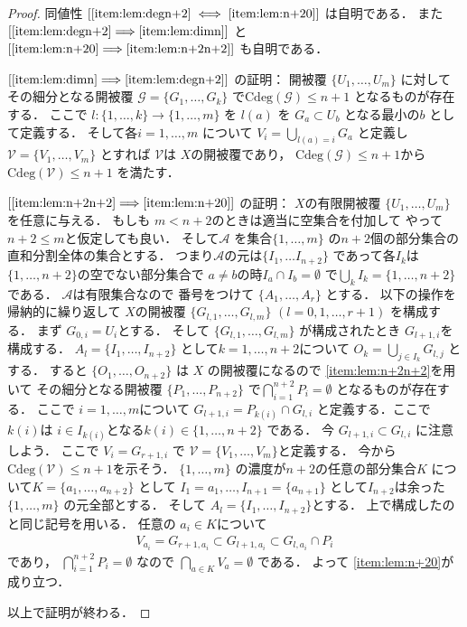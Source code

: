 \documentclass[leqno, a4paper, 12pt]{jsarticle}
\newcommand{\To}{\Longrightarrow}
\newcommand{\yodeg}{\mathrm{Cdeg}}
\numberwithin{equation}{section}
\begin{document}
\begin{proof}
同値性
$[\ref{item:lem:degn+2} \iff \ref{item:lem:n+20}]$
は自明である．
また
$[\ref{item:lem:degn+2}\To \ref{item:lem:dimn}]$
と
$[ \ref{item:lem:n+20}\To \ref{item:lem:n+2n+2}]$
も自明である．


$[\ref{item:lem:dimn}\To \ref{item:lem:degn+2}]$
の証明：
開被覆
$\{U_{1}, \dots, U_{m}\}$
に対してその細分となる開被覆
$\mathcal{G}=\{G_{1}, \dots, G_{k}\}$
で$\yodeg(\mathcal{G})\le n+1$
となるものが存在する．
ここで
$l\colon \{1, \dots, k\}\to \{1, \dots, m\}$
を
$l(a)$
を
$G_{a}\subset U_{b}$
となる最小の$b$
として定義する．
そして各$i=1, \dots,  m$
について
$V_{i}=\bigcup_{l(a)=i}G_{a}$
と定義し
$\mathcal{V}=\{V_{1}, \dots, V_{m}\}$
とすれば
$\mathcal{V}$は
$X$の開被覆であり，
$\yodeg(\mathcal{G})\le n+1$から
$\yodeg(\mathcal{V})\le n+1$
を満たす．

$[\ref{item:lem:n+2n+2}\To \ref{item:lem:n+20}]$
の証明：
$X$の有限開被覆
$\{U_{1}, \dots, U_{m}\}$
を任意に与える．
もしも
$m<n+2$のときは適当に空集合を付加して
やって$n+2\le m$と仮定しても良い．
そして$\mathcal{A}$
を集合$\{1, \dots, m\}$
の$n+2$個の部分集合の直和分割全体の集合とする．
つまり$\mathcal{A}$の元は$\{I_{1}, \dots I_{n+2}\}$
であって各$I_{k}$は$\{1, \dots, n+2\}$の空でない部分集合で
$a\neq b$の時$I_{a}\cap I_{b}=\emptyset$
で$\bigcup_{k}I_{k}=\{1, \dots, n+2\}$
である．
$\mathcal{A}$は有限集合なので
番号をつけて
$\{A_{1}, \dots, A_{r}\}$
とする．
以下の操作を帰納的に繰り返して
$X$の開被覆
$\{G_{l, 1}, \dots, G_{l, m}\}$
$(l=0, 1, \dots, r+1)$
を構成する．
まず
$G_{0, i}=U_{i}$とする．
そして
$\{G_{l, 1}, \dots, G_{l, m}\}$
が構成されたとき
$G_{l+1, i}$を構成する．
$A_{l}=\{I_{1}, \dots, I_{n+2}\}$
として$k=1, \dots, n+2$について
$O_{k}=\bigcup_{j\in I_{k}}G_{l, j}$
とする．
すると
$\{O_{1}, \dots, O_{n+2}\}$
は
$X$
の開被覆になるので
\ref{item:lem:n+2n+2}を用いて
その細分となる開被覆
$\{P_{1}, \dots, P_{n+2}\}$
で$\bigcap_{i=1}^{n+2}P_{i}=\emptyset$
となるものが存在する．
ここで
$i=1, \dots, m$について
$G_{l+1, i}=P_{k(i)}\cap G_{l, i}$
と定義する．ここで$k(i)$は
$i\in I_{k(i)}$となる$k(i)\in \{1, \dots, n+2\}$
である．
今
$G_{l+1, i}\subset G_{l, i}$
に注意しよう．
ここで
$V_{i}=G_{r+1, i}$
で
$\mathcal{V}=\{V_{1}, \dots, V_{m}\}$と定義する．
今から$\yodeg(\mathcal{V})\le n+1$を示そう．
$\{1, \dots, m\}$
の濃度が$n+2$の任意の部分集合$K$
について$K=\{a_{1}, \dots, a_{n+2}\}$
として
$I_{1}=a_{1}, \dots, I_{n+1}=\{a_{n+1}\}$
として$I_{n+2}$は余った$\{1, \dots, m\}$
の元全部とする．
そして
$A_{l}=\{I_{1}, \dots, I_{n+2}\}$とする．
上で構成したのと同じ記号を用いる．
任意の
$a_{i}\in K$について
\begin{align}
V_{a_{i}}=G_{r+1, a_{i}}\subset G_{l+1, a_{i}}\subset G_{l, a_{i}}\cap P_{i}
\end{align}
であり，
$\bigcap_{i=1}^{n+2}P_{i}=\emptyset$
なので
$\bigcap_{a\in K}V_{a}=\emptyset$
である．
よって
\ref{item:lem:n+20}が成り立つ．

以上で証明が終わる．
\end{proof}
\end{document}
